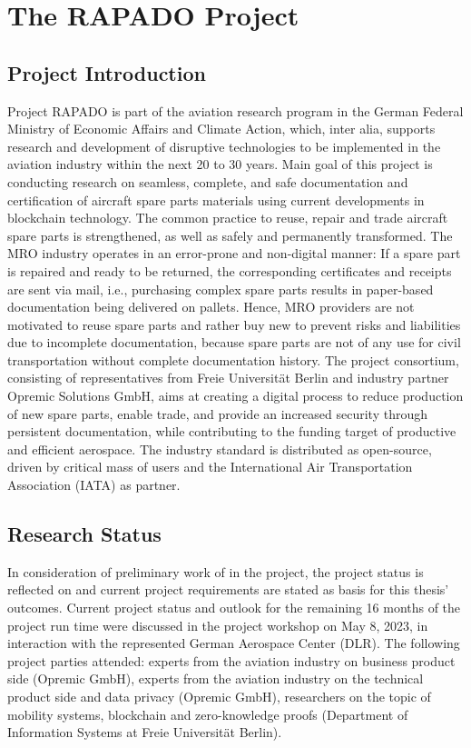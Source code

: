 \chapter{The RAPADO Project}
\section{Project Introduction}
Project RAPADO is part of the aviation research program in the German Federal Ministry of Economic Affairs and Climate Action, which, inter alia, supports research and development of disruptive technologies to be implemented in the aviation industry within the next 20 to 30 years. Main goal of this project is conducting research on seamless, complete, and safe documentation and certification of aircraft spare parts materials using current developments in blockchain technology. The common practice to reuse, repair and trade aircraft spare parts is strengthened, as well as safely and permanently transformed. The MRO industry operates in an error-prone and non-digital manner: If a spare part is repaired and ready to be returned, the corresponding certificates and receipts are sent via mail, i.e., purchasing complex spare parts results in paper-based documentation being delivered on pallets. Hence, MRO providers are not motivated to reuse spare parts and rather buy new to prevent risks and liabilities due to incomplete documentation, because spare parts are not of any use for civil transportation without complete documentation history. The project consortium, consisting of representatives from Freie Universit{\"a}t Berlin and industry partner Opremic Solutions GmbH, aims at creating a digital process to reduce production of new spare parts, enable trade, and provide an increased security through persistent documentation, while contributing to the funding target of productive and efficient aerospace. The industry standard is distributed as open-source, driven by critical mass of users and the International Air Transportation Association (IATA) as partner.

\section{Research Status}
In consideration of preliminary work of \citet{ZedelJ, Wickboldt2019BlockchainFW} in the project, the project status is reflected on and current project requirements are stated as basis for this thesis' outcomes. Current project status and outlook for the remaining 16 months of the project run time were discussed in the project workshop on May 8, 2023, in interaction with the represented German Aerospace Center (DLR). The following project parties attended: experts from the aviation industry on business product side (Opremic GmbH), experts from the aviation industry on the technical product side and data privacy (Opremic GmbH), researchers on the topic of mobility systems, blockchain and zero-knowledge proofs (Department of Information Systems at Freie Universit{\"a}t Berlin). 

